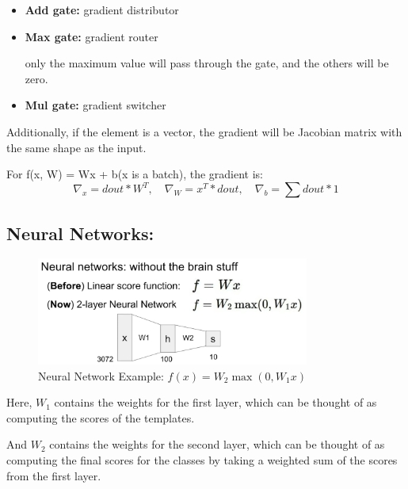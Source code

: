 \documentclass{article}
\numberwithin{equation}{section}
\begin{document}
\begin{CJK}{UTF8}{gbsn}
\begin{enumerate}
        \begin{itemize}
            \item \textbf{Add gate:} gradient distributor\par
            \item \textbf{Max gate:} gradient router\par
            only the maximum value will pass through the gate, and the others will be zero.\par
            \item \textbf{Mul gate:} gradient switcher\par
        \end{itemize}

        Additionally, if the element is a vector, the gradient will be Jacobian matrix with the same shape as the input.\par
        For f(x, W) = Wx + b(x is a batch), the gradient is:
        \begin{equation}
            \nabla_x = dout * W^T ,\quad \nabla_W = x^T * dout ,\quad \nabla_b = \sum dout * 1
        \end{equation}

\end{enumerate}

\newpage
\subsection{Neural Networks:}
    \begin{figure}[h]
        \centering
        \includegraphics[width=0.8\textwidth]{images/Lecture4/two_layer_neural_network.png}
        \caption{Neural Network Example: \(f(x) = W_2 \max(0, W_1 x)\)}
        \label{fig:neural_network}
    \end{figure}
    Here, \(W_1\) contains the weights for the first layer, which can be thought of as computing the scores of the templates.\par
    And \(W_2\) contains the weights for the second layer, which can be thought of as computing the final scores for the classes by taking a weighted sum of the scores from the first layer.\par


\end{CJK}
\end{document}
